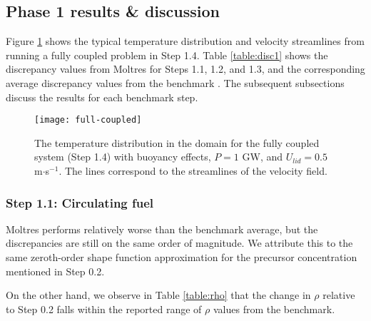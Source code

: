 \subsection{Phase 1 results \& discussion}

Figure \ref{fig:color} shows the typical temperature distribution and velocity
streamlines from running a fully coupled problem in Step 1.4. 
Table \ref{table:disc1} shows the discrepancy values from Moltres for Steps
1.1, 1.2, and 1.3,
and the corresponding average discrepancy values from the benchmark
\citep{tiberga_results_2020}. The subsequent subsections discuss the results
for each benchmark step.
%
\begin{figure}[h!]
  \centering
  \texttt{[image: full-coupled]}
  \caption{The temperature distribution in the domain for the fully coupled
  system (Step 1.4) with buoyancy effects, $P = 1$ GW, and $U_{lid} = 0.5$
  m$\cdot$s$^{-1}$. The lines correspond to the streamlines of the velocity
  field.}
  \label{fig:color}
\end{figure}

\subsubsection{Step 1.1: Circulating fuel}

Moltres performs relatively worse than the benchmark average, but the
discrepancies are still on the same order of magnitude. We attribute this to
the same zeroth-order shape function approximation for the precursor
concentration mentioned in Step 0.2.

On the other hand, we observe in Table \ref{table:rho} that the change in
$\rho$ relative to Step 0.2 falls within the reported range of $\rho$ values
from the benchmark.

